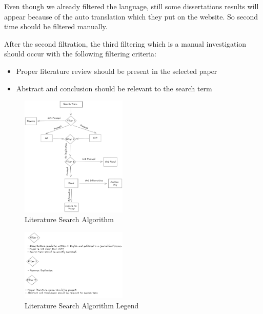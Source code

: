 \documentclass[9pt,conference]{IEEEtran}
\begin{document}
    Even though we already filtered the language, still some dissertations results will appear because of the auto translation which they put on the website.
    So second time should be filtered manually.

    After the second filtration, the third filtering which is a manual investigation should occur with the following filtering criteria:
    \begin{itemize}
        \item Proper literature review should be present in the selected paper
        \item Abstract and conclusion should be relevant to the search term
    \end{itemize}
    
    \begin{figure}
        \centering
        \includegraphics[width =0.45\textwidth]{LRMethod.png}
        \caption{Literature Search Algorithm}
        \label{fig:literaturesearchalgorithm}
    \end{figure} 
    \begin{figure}
        \centering
        \includegraphics[width =0.45\textwidth]{LRMethodLegacy.png}
        \caption{Literature Search Algorithm Legend}
        \label{fig:literaturesearchalgorithmlegend}
    \end{figure}

    

\end{document}
